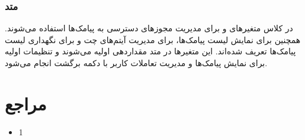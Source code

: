 \documentclass{report}
\begin{document}
\subsection{متد
}
در کلاس
 متغیرهای
  و 
  برای مدیریت مجوزهای دسترسی به پیامک‌ها استفاده می‌شوند. همچنین 
  برای نمایش لیست پیامک‌ها،
   برای مدیریت آیتم‌های چت و 
   برای نگهداری لیست پیامک‌ها تعریف شده‌اند. این متغیرها در متد
    مقداردهی اولیه می‌شوند و تنظیمات اولیه برای نمایش پیامک‌ها و مدیریت تعاملات کاربر با دکمه برگشت انجام می‌شود.
\chapter {مراجع}
\begin{itemize}
	\item 1
\end{itemize}
\end{document}
